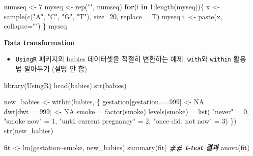 \documentclass[
]{book}
\newenvironment{Shaded}{\begin{snugshade}}{\end{snugshade}}
\newcommand{\AttributeTok}[1]{\textcolor[rgb]{0.77,0.63,0.00}{#1}}
\newcommand{\ConstantTok}[1]{\textcolor[rgb]{0.00,0.00,0.00}{#1}}
\newcommand{\ControlFlowTok}[1]{\textcolor[rgb]{0.13,0.29,0.53}{\textbf{#1}}}
\newcommand{\DecValTok}[1]{\textcolor[rgb]{0.00,0.00,0.81}{#1}}
\newcommand{\DocumentationTok}[1]{\textcolor[rgb]{0.56,0.35,0.01}{\textbf{\textit{#1}}}}
\newcommand{\FunctionTok}[1]{\textcolor[rgb]{0.00,0.00,0.00}{#1}}
\newcommand{\NormalTok}[1]{#1}
\newcommand{\OtherTok}[1]{\textcolor[rgb]{0.56,0.35,0.01}{#1}}
\newcommand{\SpecialCharTok}[1]{\textcolor[rgb]{0.00,0.00,0.00}{#1}}
\newcommand{\StringTok}[1]{\textcolor[rgb]{0.31,0.60,0.02}{#1}}
\providecommand{\tightlist}{%
  \setlength{\itemsep}{0pt}\setlength{\parskip}{0pt}}
\begin{document}
\begin{Shaded}
\begin{Highlighting}[]
\NormalTok{numseq }\OtherTok{\textless{}{-}} \DecValTok{7}
\NormalTok{myseq }\OtherTok{\textless{}{-}} \FunctionTok{rep}\NormalTok{(}\StringTok{""}\NormalTok{, numseq)}
\ControlFlowTok{for}\NormalTok{(i }\ControlFlowTok{in} \DecValTok{1}\SpecialCharTok{:}\FunctionTok{length}\NormalTok{(myseq))\{}
\NormalTok{  x }\OtherTok{\textless{}{-}} \FunctionTok{sample}\NormalTok{(}\FunctionTok{c}\NormalTok{(}\StringTok{"A"}\NormalTok{, }\StringTok{"C"}\NormalTok{, }\StringTok{"G"}\NormalTok{, }\StringTok{"T"}\NormalTok{), }\AttributeTok{size=}\DecValTok{20}\NormalTok{, }\AttributeTok{replace =}\NormalTok{ T)}
\NormalTok{  myseq[i] }\OtherTok{\textless{}{-}} \FunctionTok{paste}\NormalTok{(x, }\AttributeTok{collapse=}\StringTok{""}\NormalTok{)}
\NormalTok{\}}
\NormalTok{myseq}
\end{Highlighting}
\end{Shaded}

\textbf{Data transformation}

\begin{itemize}
\tightlist
\item
  \texttt{UsingR} 패키지의 babies 데이터셋을 적절히 변환하는 예제. \texttt{with}와 \texttt{within} 활용법 알아두기 (설명 안 함)
\end{itemize}

\begin{Shaded}
\begin{Highlighting}[]
\FunctionTok{library}\NormalTok{(UsingR)}
\FunctionTok{head}\NormalTok{(babies)}
\FunctionTok{str}\NormalTok{(babies)}


\NormalTok{new\_babies }\OtherTok{\textless{}{-}} \FunctionTok{within}\NormalTok{(babies, \{}
\NormalTok{  gestation[gestation}\SpecialCharTok{==}\DecValTok{999}\NormalTok{] }\OtherTok{\textless{}{-}} \ConstantTok{NA}
\NormalTok{  dwt[dwt}\SpecialCharTok{==}\DecValTok{999}\NormalTok{] }\OtherTok{\textless{}{-}} \ConstantTok{NA}
\NormalTok{  smoke }\OtherTok{=} \FunctionTok{factor}\NormalTok{(smoke)}
  \FunctionTok{levels}\NormalTok{(smoke) }\OtherTok{=} \FunctionTok{list}\NormalTok{(}
    \StringTok{"never"} \OtherTok{=} \DecValTok{0}\NormalTok{, }
    \StringTok{"smoke now"} \OtherTok{=} \DecValTok{1}\NormalTok{, }
    \StringTok{"until current pregnancy"} \OtherTok{=} \DecValTok{2}\NormalTok{,}
    \StringTok{"once did, not now"} \OtherTok{=} \DecValTok{3}\NormalTok{)}
\NormalTok{  \})}
\FunctionTok{str}\NormalTok{(new\_babies)}

\NormalTok{fit }\OtherTok{\textless{}{-}} \FunctionTok{lm}\NormalTok{(gestation}\SpecialCharTok{\textasciitilde{}}\NormalTok{smoke, new\_babies)}
\FunctionTok{summary}\NormalTok{(fit) }\DocumentationTok{\#\# t{-}test 결과 }
\FunctionTok{anova}\NormalTok{(fit)}
\end{Highlighting}
\end{Shaded}
\end{document}
